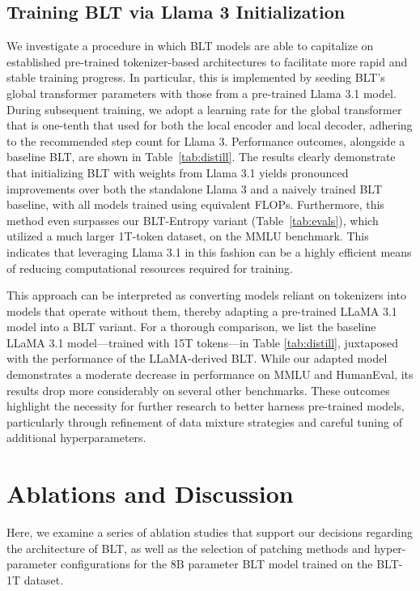 \subsection{Training {\textsc BLT} via Llama 3 Initialization}
\label{sec:distillation}
We investigate a procedure in which {\textsc BLT} models are able to capitalize on established pre-trained tokenizer-based architectures to facilitate more rapid and stable training progress. In particular, this is implemented by seeding {\textsc BLT}'s global transformer parameters with those from a pre-trained Llama 3.1 model. During subsequent training, we adopt a learning rate for the global transformer that is one-tenth that used for both the local encoder and local decoder, adhering to the recommended step count for Llama 3. Performance outcomes, alongside a baseline {\textsc BLT}, are shown in Table~\ref{tab:distill}. The results clearly demonstrate that initializing {\textsc BLT} with weights from Llama 3.1 yields pronounced improvements over both the standalone Llama 3 and a naively trained {\textsc BLT} baseline, with all models trained using equivalent FLOPs. Furthermore, this method even surpasses our {\textsc BLT}-Entropy variant (Table~\ref{tab:evals}), which utilized a much larger 1T-token dataset, on the MMLU benchmark. This indicates that leveraging Llama 3.1 in this fashion can be a highly efficient means of reducing computational resources required for training.

This approach can be interpreted as converting models reliant on tokenizers into models that operate without them, thereby adapting a pre-trained LLaMA 3.1 model into a {\textsc BLT} variant. For a thorough comparison, we list the baseline LLaMA 3.1 model—trained with 15T tokens—in Table \ref{tab:distill}, juxtaposed with the performance of the LLaMA-derived {\textsc BLT}. While our adapted model demonstrates a moderate decrease in performance on MMLU and HumanEval, its results drop more considerably on several other benchmarks. These outcomes highlight the necessity for further research to better harness pre-trained models, particularly through refinement of data mixture strategies and careful tuning of additional hyperparameters.

\section{Ablations and Discussion}
\label{section:ablations}
Here, we examine a series of ablation studies that support our decisions regarding the architecture of {\textsc BLT}, as well as the selection of patching methods and hyper-parameter configurations for the 8B parameter {\textsc BLT} model trained on the {\textsc BLT}-1T dataset.

